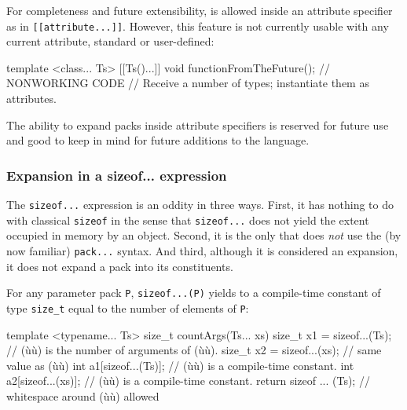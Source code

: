 \noindent For completeness and future extensibility,  is
allowed inside an attribute specifier as in \lstinline![[attribute...]]!.
However, this feature is not currently usable with any current
attribute, standard or user-defined:

\begin{emcppslisting}
template <class... Ts>
[[Ts()...]] void functionFromTheFuture();
    // NONWORKING CODE
    // Receive a number of types; instantiate them as attributes.
\end{emcppslisting}
    

\noindent The ability to expand packs inside attribute specifiers is reserved for
future use and good to keep in mind for future additions to the
language.

\subsubsection[Expansion in a \lstinline!sizeof...! expression]{Expansion in a {\SubsubsecCode sizeof...} expression}\label{expansion-in-a-sizeof...-expression}

The \lstinline!sizeof...! expression is an oddity in three ways. First, it
has nothing to do with classical \lstinline!sizeof! in the sense that
\lstinline!sizeof...! does not yield the extent occupied in memory by an
object. Second, it is the only  that
does \emph{not} use the (by now familiar) \lstinline!pack...! syntax. And
third, although it is considered an expansion, it does not expand a pack
into its constituents.

For any parameter pack \lstinline!P!, \lstinline!sizeof...(P)! yields to a
compile-time constant of type \lstinline!size_t! equal to the number of
elements of \lstinline!P!:

\begin{emcppslisting}
template <typename... Ts>
size_t countArgs(Ts... xs)
{
    size_t x1 = sizeof...(Ts);  // (ù{}ù) is the number of arguments of (ù{}ù).
    size_t x2 = sizeof...(xs);  // same value as (ù{}ù)
    int a1[sizeof...(Ts)];      // (ù{}ù) is a compile-time constant.
    int a2[sizeof...(xs)];      // (ù{}ù) is a compile-time constant.
    return sizeof ... (Ts);     // whitespace around (ù{}ù) allowed
}
\end{emcppslisting}
    

